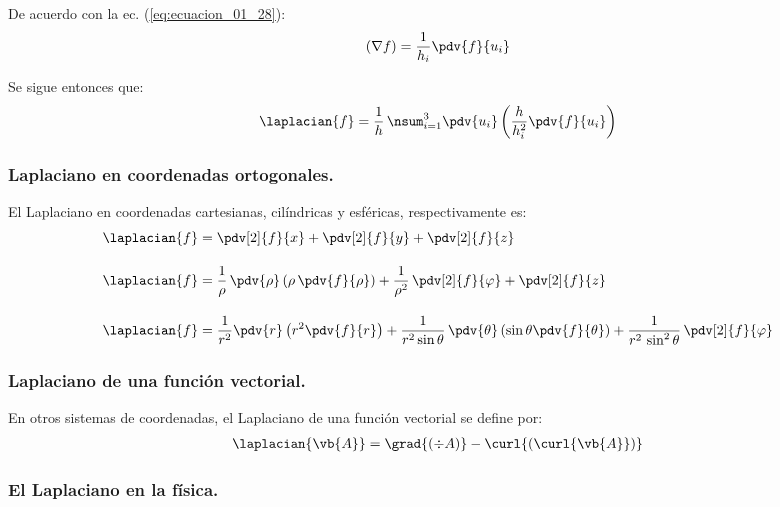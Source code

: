De acuerdo con la ec. (\ref{eq:ecuacion_01_28}):
\begin{align*}
(\nabla f) = \dfrac{1}{h_{i}} \pdv{f}{u_{i}}
\end{align*}

Se sigue entonces que:
\begin{align}
\laplacian{f} = \dfrac{1}{h} \, \nsum_{i=1}^{3} \pdv{u_{i}} \left( \dfrac{h}{h_{i}^{2}}  \pdv{f}{u_{i}} \right)
\label{eq:ecuacion_01_36}
\end{align}

\subsubsection{Laplaciano en coordenadas ortogonales.}

El Laplaciano en coordenadas cartesianas, cilíndricas y esféricas, respectivamente es:
\begin{align}
\laplacian{f} &= \pdv[2]{f}{x} + \pdv[2]{f}{y} + \pdv[2]{f}{z} \label{eq:laplaciano_cartesianas} \\[1em]
\laplacian{f} &= \dfrac{1}{\rho} \, \pdv{\rho} \left( \rho \, \pdv{f}{\rho} \right) + \dfrac{1}{\rho^{2}} \, \pdv[2]{f}{\varphi} + \pdv[2]{f}{z} \label{eq:laplaciano_cilindricas}\\[1em]
\laplacian{f} &= \dfrac{1}{r^{2}} \pdv{r} \left( r^{2} \pdv{f}{r} \right) + \dfrac{1}{r^{2} \sin \theta} \, \pdv{\theta} \left( \sin \theta \pdv{f}{\theta} \right) + \dfrac{1}{r^{2} \, \sin^{2} \theta} \, \pdv[2]{f}{\varphi} \label{eq:laplaciano_esfericas}
\end{align}

\subsubsection{Laplaciano de una función vectorial.}

En otros sistemas de coordenadas, el Laplaciano de una función vectorial se define por:
\begin{align*}
\laplacian{\vb{A}} = \grad{(\div{A})} - \curl{(\curl{\vb{A}})}
\end{align*}

\subsubsection{El Laplaciano en la física.}

